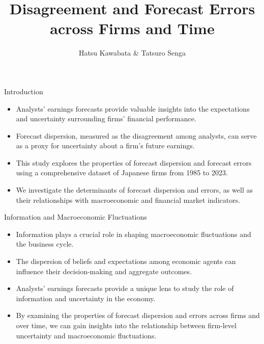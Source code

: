 \documentclass[aspectratio=169]{beamer}
\title[LSE PRESS \hspace{25mm} \insertframenumber/\inserttotalframenumber]{Disagreement and Forecast Errors \\ across Firms and Time}
\author[Advanced Macroeconomics]{Hatsu Kawabata \& Tatsuro Senga}
\begin{document}
\maketitle


\begin{frame}{Introduction}
\begin{itemize}
    \item Analysts' earnings forecasts provide valuable insights into the expectations and uncertainty surrounding firms' financial performance.
    \item Forecast dispersion, measured as the disagreement among analysts, can serve as a proxy for uncertainty about a firm's future earnings.
    \item This study explores the properties of forecast dispersion and forecast errors using a comprehensive dataset of Japanese firms from 1985 to 2023.
    \item We investigate the determinants of forecast dispersion and errors, as well as their relationships with macroeconomic and financial market indicators.
\end{itemize}
\end{frame}

\begin{frame}{Information and Macroeconomic Fluctuations}
\begin{itemize}
    \item Information plays a crucial role in shaping macroeconomic fluctuations and the business cycle.
    \item The dispersion of beliefs and expectations among economic agents can influence their decision-making and aggregate outcomes.
    \item Analysts' earnings forecasts provide a unique lens to study the role of information and uncertainty in the economy.
    \item By examining the properties of forecast dispersion and errors across firms and over time, we can gain insights into the relationship between firm-level uncertainty and macroeconomic fluctuations.
\end{itemize}
\end{frame}
\end{document}

